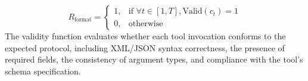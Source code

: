\documentclass{huawei}
\begin{document}
\begin{equation}
R_{\text{format}} =
\begin{cases}
1, & \text{if } \forall t \in [1, T], \text{Valid}(c_t) = 1 \\
0, & \text{otherwise}
\end{cases}
\end{equation}
The validity function evaluates whether each tool invocation conforms to the expected protocol, including XML/JSON syntax correctness, the presence of required fields, the consistency of argument types, and compliance with the tool's schema specification.



\end{document}
